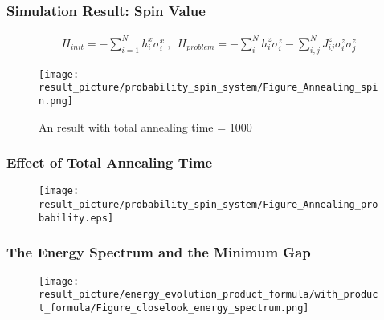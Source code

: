 \documentclass{beamer}
\begin{document}
\begin{frame}
	\frametitle{Simulation Result: Spin Value}
		\begin{equation*}
		\begin{split}
		H_{init}= -\sum_{i=1}^{N}h_i^x \sigma_i^x ~,~~ H_{problem}= -\sum_{i}^N h_i^z \sigma^z_i  -\sum_{i,j}^N J_{ij}^z \sigma^z_i \sigma^z_j
		\end{split}
		\end{equation*} 
	\begin{figure}
		\centering
		\texttt{[image: result\_picture/probability\_spin\_system/Figure\_Annealing\_spin.png]}
		\caption{An result with total annealing time = 1000}
	\end{figure}
\end{frame}

\begin{frame}
	\frametitle{Effect of Total Annealing Time}
	\begin{figure}
		\centering
		\texttt{[image: result\_picture/probability\_spin\_system/Figure\_Annealing\_probability.eps]}
		
	\end{figure}
\end{frame}

%		

\begin{frame}
	\frametitle{The Energy Spectrum and the Minimum Gap}
	\begin{figure}
		\centering
		\texttt{[image: result\_picture/energy\_evolution\_product\_formula/with\_product\_formula/Figure\_closelook\_energy\_spectrum.png]}
		
	\end{figure}
\end{frame}
\end{document}
